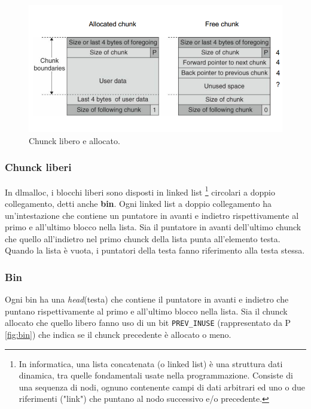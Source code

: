 \begin{figure}[H]
    \centering
    \includegraphics[width=13cm, keepaspectratio]{capitoli/secure_coding//img/cap_4/chuncks.png}
    \caption{Chunck libero e allocato.}\label{fig:chunck_lib_alloc}
\end{figure}

\subsubsection{Chunck liberi}
In dlmalloc, i blocchi liberi sono disposti in linked list
\footnote{In informatica, una lista concatenata (o linked list) è una struttura dati dinamica, tra quelle fondamentali usate nella programmazione.
    Consiste di una sequenza di nodi, ognuno contenente campi di dati arbitrari ed uno o due riferimenti ("link") che puntano al nodo successivo e/o
    precedente.}
circolari a doppio collegamento, detti anche \textbf{bin}.
Ogni linked list a doppio collegamento ha un'intestazione che contiene un puntatore in avanti e indietro rispettivamente al primo e all'ultimo blocco
nella lista. Sia il puntatore in avanti dell'ultimo chunck che quello all'indietro nel primo chunck della lista punta all'elemento testa.
Quando la lista è vuota, i puntatori della testa fanno riferimento alla testa stessa.

\subsubsection{Bin}
Ogni bin ha una \textit{head}(testa) che contiene il puntatore in avanti e indietro che puntano rispettivamente al primo e all'ultimo blocco nella lista. Sia il chunck allocato che quello libero fanno uso di un bit \verb|PREV_INUSE| (rappresentato da P \ref{fig:bin}) che indica se il chunck precedente è allocato o meno.

